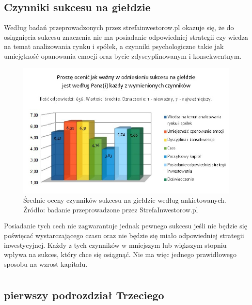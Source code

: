 \documentclass{report}
\begin{document}
\section{Czynniki sukcesu na giełdzie}
Według badań przeprowadzonych przez strefainwestorow.pl\cite{badania13} okazuje się, że do osiągnięcia sukcesu znaczenia nie ma posiadanie odpowiedniej strategii czy wiedza na temat analizowania rynku i spółek, a czynniki psychologiczne takie jak umiejętność opanowania emocji oraz bycie zdyscyplinowanym i konsekwentnym.
\begin{figure}[h]
\includegraphics[scale=0.5]{obraz1}
\caption{Średnie oceny czynników sukcesu na giełdzie według ankietowanych. Źródło: badanie przeprowadzone przez StrefaInwestorow.pl}
\end{figure}
Posiadanie tych cech nie zagwarantuje jednak pewnego sukcesu jeśli nie będzie się poświęcać wystarczającego czasu oraz nie będzie się miało odpowiedniej strategii inwestycyjnej. Każdy z tych czynników w mniejszym lub większym stopniu wpływa na sukces, który chce się osiągnąć. Nie ma więc jednego prawidłowego sposobu na wzrost kapitału. 
\newpage
\chapter{}
\section{pierwszy podrozdział Trzeciego}
\newpage
\listoffigures


\end{document}
